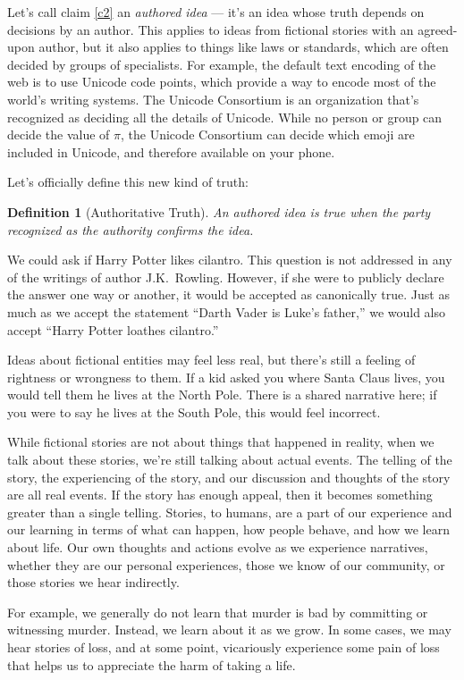 \documentclass[11pt, oneside]{article}   	%
\newtheorem{defn}{Definition}
\begin{document}
Let's call claim \ref{c2} an {\em authored idea} --- it's an idea whose
truth depends on decisions by an author.
This applies to ideas from fictional stories with an agreed-upon
author, but it also applies to things like laws or standards, which are often
decided by groups of specialists. For example, the default text encoding of the
web is to use Unicode code points, which provide a way to encode most of the
world's writing systems. The Unicode Consortium is an organization that's
recognized as deciding all the details of Unicode.
While no person or group can decide the value of $\pi$, the Unicode Consortium
can decide which emoji are included in Unicode, and therefore available on your
phone.

Let's officially define this new kind of truth:
\begin{defn}[Authoritative Truth]
    An authored idea is true when the party recognized as the authority confirms
    the idea.
\end{defn}

We could ask if Harry Potter likes cilantro. This question is not addressed in
any of the writings of author J.K.~Rowling. However, if she were to publicly
declare the answer one way or another, it would be accepted as canonically true.
Just as much as we accept the statement ``Darth Vader is Luke's father,'' we
would also accept ``Harry Potter loathes cilantro.''

Ideas about fictional entities may feel less real,
but there's still a feeling of rightness or wrongness to them.
If a kid asked you where Santa Claus lives, you would tell them he
lives at the North Pole. There is a shared narrative here; if you were to say he
lives at the South Pole, this would feel incorrect.

While fictional stories are not about things that happened in reality, when we
talk about these stories, we're still talking about actual events. The telling
of the story,
the experiencing of the story, and our discussion and thoughts of the
story are all real events.
If the story has enough appeal,
then it becomes something greater than a single telling.
Stories,
to humans, are a part of our experience and our learning in terms of what can
happen, how people behave, and how we learn about life. Our own thoughts and
actions evolve as we experience narratives, whether they are our personal
experiences, those we know of our community, or those stories we hear
indirectly.

For example, we generally do not learn that murder is bad by committing or
witnessing murder. Instead, we learn about it as we grow. In some cases, we may
hear stories of loss, and at some point, vicariously experience some pain of
loss that helps us to appreciate the harm of taking a life.
\end{document}
